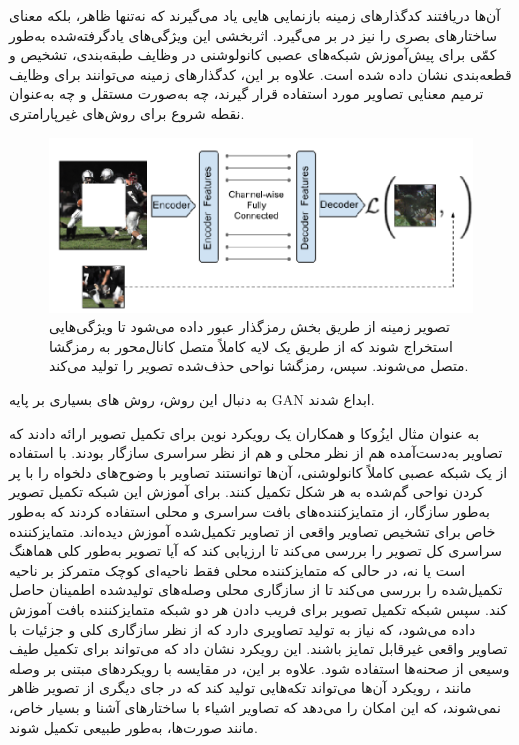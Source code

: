 آن‌ها دریافتند  کدگذارهای زمینه بازنمایی هایی یاد می‌گیرند که نه‌تنها ظاهر، بلکه معنای ساختارهای بصری را نیز در بر می‌گیرد. اثربخشی این ویژگی‌های یادگرفته‌شده به‌طور کمّی برای پیش‌آموزش شبکه‌های عصبی کانولوشنی در وظایف طبقه‌بندی، تشخیص و قطعه‌بندی نشان داده شده است. علاوه بر این، کدگذارهای زمینه می‌توانند برای وظایف ترمیم معنایی تصاویر مورد استفاده قرار گیرند، چه به‌صورت مستقل و چه به‌عنوان نقطه شروع برای روش‌های غیرپارامتری.
\begin{figure}
	\centering
	\includegraphics[width=0.7\linewidth]{figs/contextencodersArchitecture}
	\caption[معماری کلی Context Encoders]{
	تصویر زمینه از طریق بخش رمزگذار عبور داده می‌شود تا ویژگی‌هایی استخراج شوند که از طریق یک لایه کاملاً متصل کانال‌محور به رمزگشا متصل می‌شوند. سپس، رمزگشا نواحی حذف‌شده تصویر را تولید می‌کند.}
	\label{fig:contextencodersarchitecture}
\end{figure}

به دنبال این روش، روش های بسیاری بر پایه GAN ابداع شدند. 
\cite{caoLearningSketchTensor2021}
\cite{guoImageInpaintingConditional2024}
\cite{liRecurrentFeatureReasoning2020}
\cite{nazeriEdgeConnectGenerativeImage2019}
\cite{pengGeneratingDiverseStructure2021}

به عنوان مثال ایزُوکا و همکاران یک رویکرد نوین برای تکمیل تصویر ارائه دادند
\cite{iizukaGloballyLocallyConsistent2017}
که تصاویر به‌دست‌آمده هم از نظر محلی و هم از نظر سراسری سازگار بودند. با استفاده از یک شبکه عصبی کاملاً کانولوشنی، آن‌ها توانستند تصاویر با وضوح‌های دلخواه را با پر کردن نواحی گم‌شده به هر شکل تکمیل کنند. برای آموزش این شبکه تکمیل تصویر به‌طور سازگار، از متمایزکننده‌های بافت سراسری و محلی استفاده کردند که به‌طور خاص برای تشخیص تصاویر واقعی از تصاویر تکمیل‌شده آموزش دیده‌اند. متمایزکننده سراسری کل تصویر را بررسی می‌کند تا ارزیابی کند که آیا تصویر به‌طور کلی هماهنگ است یا نه، در حالی که متمایزکننده محلی فقط ناحیه‌ای کوچک متمرکز بر ناحیه تکمیل‌شده را بررسی می‌کند تا از سازگاری محلی وصله‌های تولیدشده اطمینان حاصل کند. سپس شبکه تکمیل تصویر برای فریب دادن هر دو شبکه متمایزکننده بافت آموزش داده می‌شود، که نیاز به تولید تصاویری دارد که از نظر سازگاری کلی و جزئیات با تصاویر واقعی غیرقابل تمایز باشند. این رویکرد نشان داد که می‌تواند برای تکمیل طیف وسیعی از صحنه‌ها استفاده شود. علاوه بر این، در مقایسه با رویکردهای مبتنی بر وصله مانند ، رویکرد آن‌ها می‌تواند تکه‌هایی تولید کند که در جای دیگری از تصویر ظاهر نمی‌شوند، که این امکان را می‌دهد که تصاویر اشیاء با ساختارهای آشنا و بسیار خاص، مانند صورت‌ها، به‌طور طبیعی تکمیل شوند.\\

